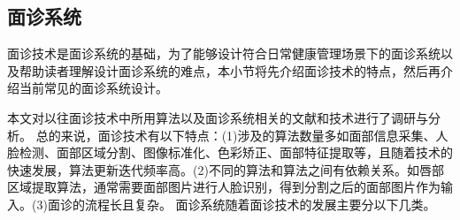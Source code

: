 \subsection{面诊系统}
\label{subsec:面诊系统}
面诊技术是面诊系统的基础，为了能够设计符合日常健康管理场景下的面诊系统以及帮助读者理解设计面诊系统的难点，本小节将先介绍面诊技术的特点，然后再介绍当前常见的面诊系统设计。

本文对以往面诊技术中所用算法以及面诊系统相关的文献和技术进行了调研与分析。
总的来说，面诊技术有以下特点：(1)涉及的算法数量多如面部信息采集、人脸检测、面部区域分割、图像标准化、色彩矫正、面部特征提取等\cite{宋海贝2018中医面诊信息自动识别方法研究进展}，且随着技术的快速发展，算法更新迭代频率高\cite{esteva2021deep}。(2)不同的算法和算法之间有依赖关系。如唇部区域提取算法，通常需要面部图片进行人脸识别，得到分割之后的面部图片作为输入\cite{Hu2016Robust}。(3)面诊的流程长且复杂\cite{林锋2019中医面诊系统调研报告}。
面诊系统随着面诊技术的发展主要分以下几类。

